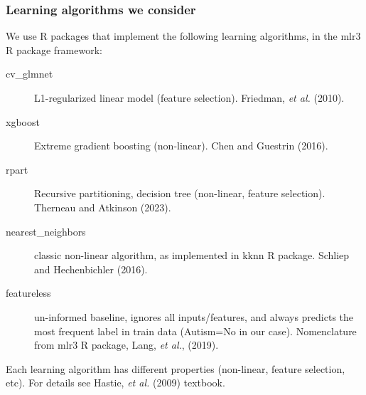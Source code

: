 \documentclass{beamer}
\begin{document}
\begin{frame}
  \frametitle{Learning algorithms we consider}
  We use R packages that implement the following learning
  algorithms, in the mlr3 R package framework:
\begin{description}
\item[cv\_glmnet] L1-regularized linear model (feature
  selection). Friedman, \emph{et al.} (2010).
\item[xgboost] Extreme gradient boosting (non-linear). Chen and Guestrin (2016). 
\item[rpart] Recursive partitioning, decision tree (non-linear, feature selection). Therneau and Atkinson (2023).
\item[nearest\_neighbors] classic non-linear algorithm, as implemented
  in kknn R package. Schliep and Hechenbichler (2016).
\item[featureless] un-informed baseline, ignores all inputs/features,
  and always predicts the most frequent label in train data (Autism=No
  in our case). Nomenclature from mlr3 R package, Lang, \emph{et al.},
  (2019).
\end{description}
Each learning algorithm has different properties (non-linear, feature
selection, etc). For details see Hastie, {\it et al.} (2009) textbook.
\end{frame}
\end{document}
